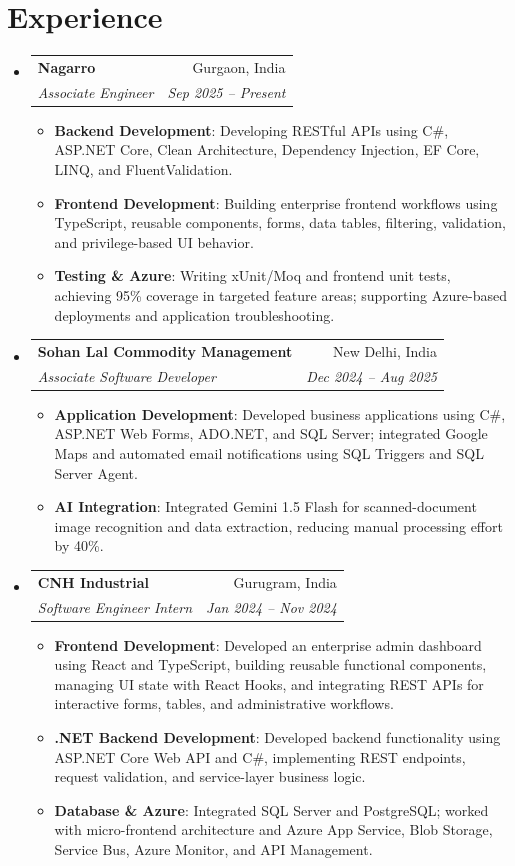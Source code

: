 \documentclass[a4paper,9pt]{article}
\makeatletter
\newcommand{\resumeItem}[2]{
  \item\small{\textbf{#1}: #2 \vspace{-2pt}}
}
\newcommand{\resumeSubheading}[4]{
  \vspace{-1pt}\item
  \begin{tabular*}{0.97\textwidth}{l@{\extracolsep{\fill}}r}
    \textbf{#1} & #2 \\
    \textit{#3} & \textit{#4} \\
  \end{tabular*}\vspace{-5pt}
}
\newcommand{\resumeSubHeadingListStart}{
  \begin{itemize}[leftmargin=*,itemsep=1pt,topsep=2pt]
}
\newcommand{\resumeSubHeadingListEnd}{
  \end{itemize}\vspace{-3pt}
}
\newcommand{\resumeItemListStart}{
  \begin{itemize}[leftmargin=15pt,itemsep=1pt,topsep=2pt]
}
\newcommand{\resumeItemListEnd}{
  \end{itemize}\vspace{-5pt}
}
\makeatother
\begin{document}
\section{\color{BlueViolet} Experience}
\resumeSubHeadingListStart

\resumeSubheading
{\color{Blue} Nagarro}{Gurgaon, India}
{Associate Engineer}{Sep 2025 -- Present}
\resumeItemListStart
\resumeItem{Backend Development}
{Developing RESTful APIs using C\#, ASP.NET Core, Clean Architecture, Dependency Injection, EF Core, LINQ, and FluentValidation.}
\resumeItem{Frontend Development}
{Building enterprise frontend workflows using TypeScript, reusable components, forms, data tables, filtering, validation, and privilege-based UI behavior.}
\resumeItem{Testing \& Azure}
{Writing xUnit/Moq and frontend unit tests, achieving 95\% coverage in targeted feature areas; supporting Azure-based deployments and application troubleshooting.}
\resumeItemListEnd

\vspace{4pt}
\resumeSubheading
{\color{Blue} Sohan Lal Commodity Management}{New Delhi, India}
{Associate Software Developer}{Dec 2024 -- Aug 2025}
\resumeItemListStart
\resumeItem{Application Development}
{Developed business applications using C\#, ASP.NET Web Forms, ADO.NET, and SQL Server; integrated Google Maps and automated email notifications using SQL Triggers and SQL Server Agent.}
\resumeItem{AI Integration}
{Integrated Gemini 1.5 Flash for scanned-document image recognition and data extraction, reducing manual processing effort by 40\%.}
\resumeItemListEnd

\vspace{4pt}
\resumeSubheading
{\color{Blue} CNH Industrial}{Gurugram, India}
{Software Engineer Intern}{Jan 2024 -- Nov 2024}
\resumeItemListStart
\resumeItem{Frontend Development}
{Developed an enterprise admin dashboard using React and TypeScript, building reusable functional components, managing UI state with React Hooks, and integrating REST APIs for interactive forms, tables, and administrative workflows.}
\resumeItem{.NET Backend Development}
{Developed backend functionality using ASP.NET Core Web API and C\#, implementing REST endpoints, request validation, and service-layer business logic.}
\resumeItem{Database \& Azure}
{Integrated SQL Server and PostgreSQL; worked with micro-frontend architecture and Azure App Service, Blob Storage, Service Bus, Azure Monitor, and API Management.}
\resumeItemListEnd
\resumeSubHeadingListEnd
\end{document}
